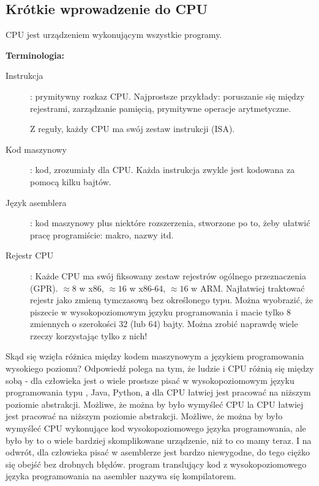 \subsection{Krótkie wprowadzenie do CPU}

\ac{CPU} jest urządzeniem wykonującym wszystkie programy.

\textbf{Terminologia:}

\begin{description}
\item[Instrukcja]: prymitywny rozkaz \ac{CPU}.
Najprostsze przykłady: poruszanie się między rejestrami, zarządzanie pamięcią, prymitywne operacje arytmetyczne. 

Z reguły, każdy \ac{CPU} ma swój zestaw instrukcji (\ac{ISA}).

\item[Kod maszynowy]: kod, zrozumiały dla \ac{CPU}. 
Każda instrukcja zwykle jest kodowana za pomocą kilku bajtów.
\item[Język asemblera]: kod maszynowy plus niektóre rozszerzenia, stworzone po to, żeby ułatwić pracę programiście: makro, nazwy itd.
\item[Rejestr CPU]: Każde \ac{CPU} ma swój fiksowany zestaw rejestrów ogólnego przeznaczenia (\ac{GPR}).
$\approx 8$ w x86, $\approx 16$ w x86-64, $\approx 16$ w ARM.
Najłatwiej traktować rejestr jako zmieną tymczasową bez określonego typu. Można wyobrazić, że piszecie w wysokopoziomowym języku programowania i macie tylko 8 zmiennych o szerokości 32 (lub 64) bajty. Można zrobić naprawdę wiele rzeczy korzystając tylko z nich!
\end{description}

Skąd się wzięła różnica między kodem maszynowym a językiem programowania wysokiego poziomu? Odpowiedź polega na tym, że ludzie i \ac{CPU} różnią się między sobą - dla człowieka jest o wiele prostsze pisać w wysokopoziomowym języku programowania typu \CCpp, Java, Python, а dla \ac{CPU} łatwiej jest pracować na niższym poziomie abstrakcji.
Możliwe, że można by było wymyśleć \ac{CPU} la CPU łatwiej jest pracować na niższym poziomie abstrakcji. Możliwe, że można by było wymyśleć CPU wykonujące kod wysokopoziomowego języka programowania, ale było by to o wiele bardziej skomplikowane urządzenie, niż to co mamy teraz. I na odwrót, dla człowieka pisać w asemblerze jest bardzo niewygodne, do tego ciężko się obejść bez drobnych błędów. program translujący kod z wysokopoziomowego języka programowania na asembler nazywa się kompilatorem.

%
%
%

